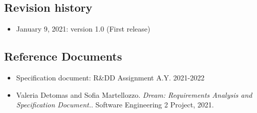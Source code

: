 \subsection{Revision history}
\begin{itemize}
    \item January 9, 2021: version 1.0 (First release)
\end{itemize}

\subsection{Reference Documents}
\begin{itemize}
    \item Specification document: R\&DD Assignment A.Y. 2021-2022
    \item Valeria Detomas and Sofia Martellozzo. \textsl{Dream: Requirements Analysis and Specification Document.}. Software Engineering 2 Project, 2021.
\end{itemize}

